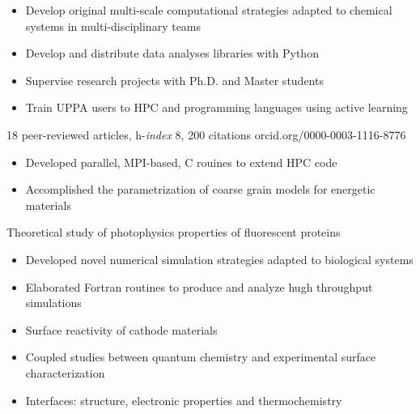 \documentclass[10pt,a4paper,ragged2e]{../altacv}
\begin{document}
\begin{itemize}
\item Develop original multi-scale computational strategies adapted to chemical systems in
multi-disciplinary teams
\item Develop and distribute data analyses libraries with Python
\item Supervise research projects with Ph.D. and Master students
\item Train UPPA users to HPC and programming languages using active learning
\end{itemize}
{\small 18 peer-reviewed articles, h-\textit{index} 8, 200 citations \hfill \hspace{-1ex}orcid.org/0000-0003-1116-8776}

\divider

\begin{itemize}
\item Developed parallel, MPI-based, C rouines to extend HPC code
\item Accomplished the parametrization of coarse grain models for energetic materials
\end{itemize}

\divider

Theoretical study of photophysics properties of fluorescent proteins
\smallskip
\begin{itemize}
\item Developed novel numerical simulation strategies adapted to biological systems 
\item Elaborated Fortran routines to produce and analyze hugh throughput simulations
\end{itemize}



\vspace{-1mm}
\begin{itemize}
\item Surface reactivity of cathode materials
\item Coupled studies between quantum chemistry and experimental surface characterization
\item Interfaces: structure, electronic properties and thermochemistry
\end{itemize}
\end{document}

